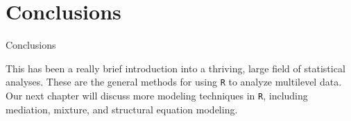 \section{Conclusions}\label{conclusions}

\begin{frame}[fragile]{Conclusions}

This has been a really brief introduction into a thriving, large field
of statistical analyses. These are the general methods for using
\texttt{R} to analyze multilevel data. Our next chapter will discuss
more modeling techniques in \texttt{R}, including mediation, mixture,
and structural equation modeling.

\end{frame}
